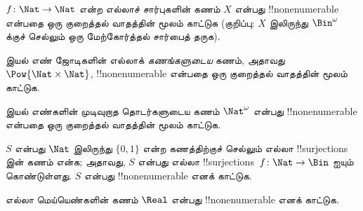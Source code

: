 \documentclass[../../../include/open-logic-section]{subfiles}
\begin{document}
\begin{prob}\label{sfr:siz:red-alt:prob:nat-nat}
  $f\colon \Nat \to \Nat$ என்ற எல்லாச் சார்புகளின் கணம் $X$ என்பது
  !!{nonenumerable} என்பதை ஒரு குறைத்தல் வாதத்தின் மூலம் காட்டுக
  (குறிப்பு: $X$ இலிருந்து $\Bin^\omega$ க்குச் செல்லும்
  ஒரு மேற்கோர்த்தல் சார்பைத் தருக).
\end{prob}

\begin{prob}
இயல் எண் ஜோடிகளின் எல்லாக் \emph{கணங்களுடைய} கணம்,
அதாவது $\Pow{\Nat \times \Nat}$, !!{nonenumerable} என்பதை
ஒரு குறைத்தல் வாதத்தின் மூலம் காட்டுக.
\end{prob}

\begin{prob}
இயல் எண்களின் முடிவுறாத தொடர்களுடைய கணம் $\Nat^\omega$ என்பது
!!{nonenumerable} என்பதை ஒரு குறைத்தல் வாதத்தின் மூலம் காட்டுக.
\end{prob}


\begin{prob}
$S$ என்பது $\Nat$ இலிருந்து $\{0,1\}$ என்ற கணத்திற்குச் செல்லும்
எல்லா !!{surjection}s இன் கணம் என்க;
அதாவது, $S$ என்பது எல்லா !!{surjection}s~$f \colon \Nat
\to \Bin$ ஐயும் கொண்டுள்ளது.
$S$ என்பது !!{nonenumerable} எனக் காட்டுக.
\end{prob}

\begin{prob}
எல்லா மெய்யெண்களின் கணம் $\Real$ என்பது !!{nonenumerable} எனக் காட்டுக.
\end{prob}
\end{document}
